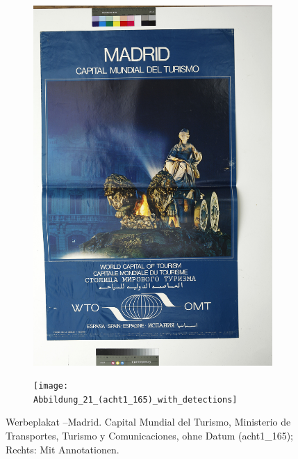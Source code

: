 \documentclass[a4paper,12pt,ngerman]{article}
\begin{document}
\newpage
\begin{landscape}
\begin{figure}[ht]
	\begin{subfigure}[b]{0.5\linewidth}
	\centering
	\includegraphics[height=\linewidth]{Abbildung_25_(acht1_165)}
	\end{subfigure}
	\begin{subfigure}[b]{0.5\linewidth}
	\centering
	\texttt{[image: Abbildung\_21\_(acht1\_165)\_with\_detections]}
	\end{subfigure}
	\caption{Werbeplakat –Madrid. Capital Mundial del Turismo, Ministerio de Transportes, Turismo y Comunicaciones, ohne Datum (acht1\_165); Rechts: Mit Annotationen.}
\end{figure}
\end{landscape}
\end{document}
